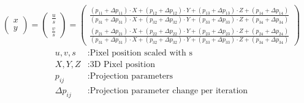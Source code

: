 \documentclass[11pt,a4paper,titlepage,oneside]{report}
\begin{document}
\begin{equation}\label{eq:refinement_projection}
  \begin{gathered}
    \begin{pmatrix}
      x \\
      y 
    \end{pmatrix}=
    \begin{pmatrix}
      \frac{u}{s} \\
      \frac{v}{s} 
    \end{pmatrix}=
    \begin{pmatrix}
      \frac{(p_{11} + \Delta p_{11}) \cdot X + (p_{12} + \Delta p_{12}) \cdot Y + (p_{13} + \Delta p_{13}) \cdot Z + (p_{14} + \Delta p_{14})}{(p_{31}+\Delta p_{31}) \cdot X + (p_{32} + \Delta p_{32}) \cdot Y + (p_{33} + \Delta p_{33}) \cdot Z + (p_{34} + \Delta p_{34})}  \\
      \frac{(p_{21} + \Delta p_{21}) \cdot X + (p_{22} + \Delta p_{22}) \cdot Y + (p_{23} + \Delta p_{23}) \cdot Z + (p_{24} + \Delta p_{24})}{(p_{31}+\Delta p_{31}) \cdot X + (p_{32} + \Delta p_{32}) \cdot Y + (p_{33} + \Delta p_{33}) \cdot Z + (p_{34} + \Delta p_{34})}
    \end{pmatrix}
  \end{gathered}
\end{equation}
\begin{align*}
  u,v,s           &:  \text{Pixel position scaled with s}\\
  X,Y,Z           &:  \text{3D Pixel position}\\
  p_{ij}          &:  \text{Projection parameters}\\
  \Delta p_{ij}   &:  \text{Projection parameter change per iteration}\\
\end{align*}
\end{document}
